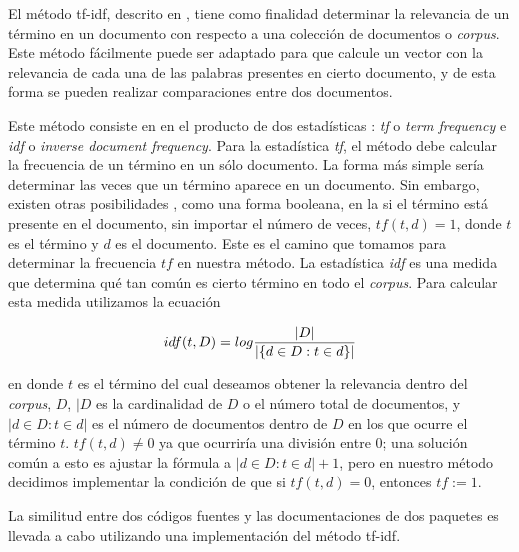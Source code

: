 \documentclass[times, 10pt,twocolumn, a4paper]{article}
\begin{document}

El m\'etodo tf-idf, descrito en \cite{ml3}, tiene como finalidad determinar la relevancia de un
t\'ermino en un documento con respecto a una colecci\'on de documentos
o \textit{corpus}. Este m\'etodo f\'acilmente puede ser adaptado para
que calcule un vector con la relevancia de cada una de las palabras
presentes en cierto documento, y de esta forma se pueden realizar
comparaciones entre dos documentos.

Este m\'etodo consiste en en el producto de dos estad\'isticas \cite{ml5}: \textit{tf} o
\textit{term frequency} e \textit{idf} o \textit{inverse document
  frequency}. Para la estad\'istica \textit{tf}, el m\'etodo debe
calcular la frecuencia de un t\'ermino en un s\'olo documento. La
forma m\'as simple ser\'ia determinar las veces que un t\'ermino
aparece en un documento. Sin embargo, existen otras posibilidades
\cite{ml6}, como una forma booleana, en la si el t\'ermino est\'a
presente en el documento, sin importar el n\'umero de veces, \(tf(t,d)
= 1\), donde \(t\) es el t\'ermino y \(d\) es el documento. Este es el
camino que tomamos para determinar la frecuencia \(tf\) en nuestra
m\'etodo. La estad\'istica \textit{idf} es una medida que determina
qu\'e tan com\'un es cierto t\'ermino en todo el \textit{corpus}. Para
calcular esta medida utilizamos la ecuaci\'on

\begin{align}
  idf(t,D) = log {\vert D \vert \over \vert \{ d\in D : t \in d\}\vert }
\end{align}

en donde \(t\) es el t\'ermino del cual deseamos obtener la relevancia
dentro del \textit{corpus}, \(D\), \(\vert D \) es la cardinalidad de
\(D\) o el n\'umero total de documentos, y \( \vert d \in D : t \in d
\vert \) es el n\'umero de documentos dentro de \(D\) en los que
ocurre el t\'ermino \(t\). \( tf(t, d) \ne 0 \) ya que ocurrir\'ia una
divisi\'on entre 0; una soluci\'on com\'un a esto es ajustar la
f\'ormula a \( \vert d \in D : t \in d \vert + 1 \), pero en nuestro
m\'etodo decidimos implementar la condici\'on de que si \( tf(t, d) =
0 \), entonces \( tf := 1 \).

La similitud entre dos c\'odigos fuentes y las documentaciones de dos
paquetes es llevada a cabo utilizando una implementaci\'on del
m\'etodo tf-idf.
\end{document}
